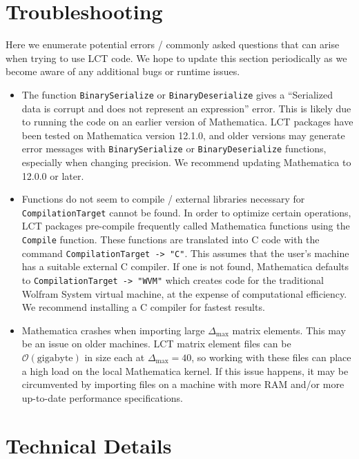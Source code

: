 \documentclass[12pt]{article}
\newcommand{\Ocal}{{\mathcal O}}
\begin{document}
\section{Troubleshooting}
\label{sec:trouble}

Here we enumerate potential errors / commonly asked questions that can arise when trying to use LCT code. We hope to update this section periodically as we become aware of any additional bugs or runtime issues. \begin{itemize}
  \item The function {\tt BinarySerialize} or {\tt BinaryDeserialize} gives a ``Serialized data is corrupt and does not represent an expression'' error.
  \subitem This is likely due to running the code on an earlier version of Mathematica. LCT packages have been tested on Mathematica version 12.1.0, and older versions may generate error messages with {\tt BinarySerialize} or {\tt BinaryDeserialize} functions, especially when changing precision. We recommend updating Mathematica to 12.0.0 or later.
  \item Functions do not seem to compile / external libraries necessary for {\tt CompilationTarget} cannot be found.
  \subitem In order to optimize certain operations,  LCT packages pre-compile frequently called Mathematica functions using the {\tt Compile} function. These functions are translated into C code with the command {\tt CompilationTarget -> "C"}. This assumes that the user's machine has a suitable external C compiler. If one is not found, Mathematica defaults to {\tt CompilationTarget -> "WVM"} which creates code for the traditional Wolfram System virtual machine, at the expense of computational efficiency. We recommend installing a C compiler for fastest results. 
  \item Mathematica crashes when importing large $\Delta_{\textrm{max}}$ matrix elements.
  \subitem This may be an issue on older machines. LCT matrix element files can be $\Ocal(\textrm{gigabyte})$ in size each at $\Delta_{\textrm{max}}=40$, so working with these files can place a high load on the local Mathematica kernel. If this issue happens, it may be circumvented by importing files on a machine with more RAM and/or more up-to-date performance specifications.
\end{itemize}


\section{Technical Details}
\label{sec:technical}
\end{document}
